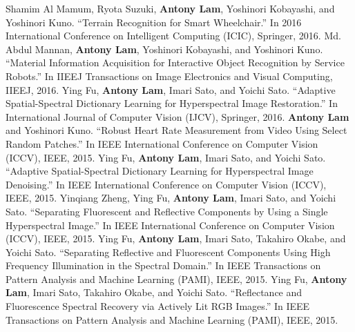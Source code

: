 \documentclass[letterpaper,10pt]{article}
\begin{document}
Shamim Al Mamum, Ryota Suzuki, \textbf{Antony Lam}, Yoshinori Kobayashi, and Yoshinori Kuno. ``Terrain Recognition for Smart Wheelchair.'' In 2016 International Conference on Intelligent Computing (ICIC), Springer, 2016.
\vspace{0.05in}\newline
Md. Abdul Mannan, \textbf{Antony Lam}, Yoshinori Kobayashi, and Yoshinori Kuno. ``Material Information Acquisition for Interactive Object Recognition by Service Robots.'' In IIEEJ Transactions on Image Electronics and Visual Computing, IIEEJ, 2016.\vspace{0.05in}\newline
Ying Fu, \textbf{Antony Lam}, Imari Sato, and Yoichi Sato. ``Adaptive Spatial-Spectral Dictionary Learning for Hyperspectral Image Restoration.'' In International Journal of Computer Vision (IJCV), Springer, 2016.\vspace{0.05in}\newline\newline
\textbf{Antony Lam} and Yoshinori Kuno. ``Robust Heart Rate Measurement from Video Using Select Random Patches.'' In IEEE International Conference on Computer Vision (ICCV), IEEE, 2015.\vspace{0.05in}\newline
Ying Fu, \textbf{Antony Lam}, Imari Sato, and Yoichi Sato. ``Adaptive Spatial-Spectral Dictionary Learning for Hyperspectral Image Denoising.'' In IEEE International Conference on Computer Vision (ICCV), IEEE, 2015.\vspace{0.05in}\newline
Yinqiang Zheng, Ying Fu, \textbf{Antony Lam}, Imari Sato, and Yoichi Sato. ``Separating Fluorescent and Reflective Components by Using a Single Hyperspectral Image.'' In IEEE International Conference on Computer Vision (ICCV), IEEE, 2015.\vspace{0.05in}\newline
Ying Fu, \textbf{Antony Lam}, Imari Sato, Takahiro Okabe, and Yoichi Sato. ``Separating Reflective and Fluorescent Components Using High Frequency Illumination in the Spectral Domain.'' In IEEE Transactions on Pattern Analysis and Machine Learning (PAMI), IEEE, 2015.\vspace{0.05in}\newline
Ying Fu, \textbf{Antony Lam}, Imari Sato, Takahiro Okabe, and Yoichi Sato. ``Reflectance and Fluorescence Spectral Recovery via Actively Lit RGB Images.'' In IEEE Transactions on Pattern Analysis and Machine Learning (PAMI), IEEE, 2015.\vspace{0.05in}\newline
\end{document}
